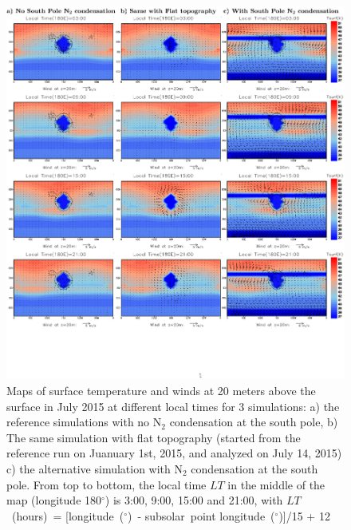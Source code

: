 \begin{figure}
  \begin{center}
    \includegraphics[width=17.cm,angle=-0,clip]{figures/fig_tsurf.eps} 
    \caption{
\label{fg:map_ts}
Maps of surface temperature and winds at 20 meters above the surface in July 2015 at different
local times for 3 simulations: 
a) the reference simulations with no N$_2$ condensation at the south pole, 
b) The same simulation with flat topography (started from the reference run on
Juanuary 1st, 2015, and analyzed on July 14, 2015) 
c) the alternative simulation with N$_2$
condensation at the south pole. 
From top to bottom, the local time $LT$ in
the middle of the map (longitude 180$^\circ$) is 3:00, 9:00, 15:00 and 21:00,
with
$LT$~(hours)~= [longitude~($^\circ$)~- subsolar~point longitude~($^\circ$)]/15 + 12
    }%
  \end{center}
\end{figure}

